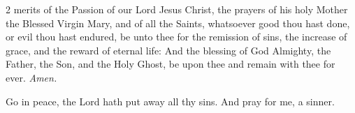 \begin{multicols}{2}
 merits of the Passion of our Lord Jesus Christ, the prayers of his holy Mother the Blessed Virgin Mary, and of all the Saints, whatsoever good thou hast done, or evil thou hast endured, be unto thee for the remission of sins, the increase of grace, and the reward of eternal life: And the blessing of God Almighty, the Father, {} the Son, and the Holy Ghost, be upon thee and remain with thee for ever. \textit{Amen.}%
\par\noindent
\begin{center}
	Go in peace, the Lord hath put away all thy sins. 
	And pray for me, a sinner.
\end{center}
\end{multicols}